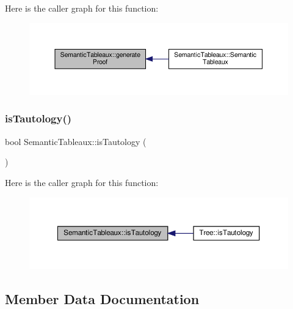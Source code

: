 Here is the caller graph for this function\+:\nopagebreak
\begin{figure}[H]
\begin{center}
\leavevmode
\includegraphics[width=350pt]{d6/d22/class_semantic_tableaux_ab41b0fa5d87d29ad807b410f18ce93a7_icgraph}
\end{center}
\end{figure}
\mbox{\label{class_semantic_tableaux_a18a9f8fc5dce074c040564454fd710c3}} 
\subsubsection{\texorpdfstring{is\+Tautology()}{isTautology()}}
{\footnotesize\ttfamily bool Semantic\+Tableaux\+::is\+Tautology (\begin{DoxyParamCaption}{ }\end{DoxyParamCaption})}

Here is the caller graph for this function\+:\nopagebreak
\begin{figure}[H]
\begin{center}
\leavevmode
\includegraphics[width=350pt]{d6/d22/class_semantic_tableaux_a18a9f8fc5dce074c040564454fd710c3_icgraph}
\end{center}
\end{figure}


\subsection{Member Data Documentation}
\mbox{\label{class_semantic_tableaux_aff7d804483776b8517694f308a3071df}} 
